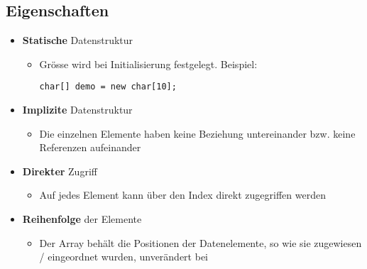\subsection{Eigenschaften}
\begin{itemize}[noitemsep,topsep=0pt,leftmargin=*]
    \item \textbf{Statische} Datenstruktur
    \begin{itemize}[noitemsep,topsep=0pt,leftmargin=*]
        \item Grösse wird bei Initialisierung festgelegt. Beispiel:
        \begin{lstlisting}
char[] demo = new char[10];
        \end{lstlisting}
    \end{itemize}
    \item \textbf{Implizite} Datenstruktur
    \begin{itemize}[noitemsep,topsep=0pt,leftmargin=*]
        \item Die einzelnen Elemente haben keine Beziehung untereinander bzw. keine Referenzen aufeinander
    \end{itemize}
    \item \textbf{Direkter} Zugriff
    \begin{itemize}[noitemsep,topsep=0pt,leftmargin=*]
        \item Auf jedes Element kann über den Index direkt zugegriffen werden
    \end{itemize}
    \item \textbf{Reihenfolge} der Elemente
    \begin{itemize}[noitemsep,topsep=0pt,leftmargin=*]
        \item Der Array behält die Positionen der Datenelemente, so wie sie zugewiesen / eingeordnet wurden, unverändert bei
    \end{itemize}
\end{itemize}
